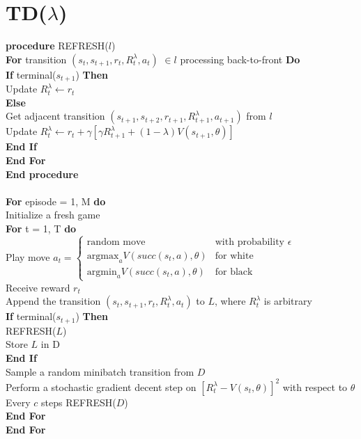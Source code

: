 \documentclass{article}
\begin{document}
\pagebreak

\section{TD($\lambda$)}
\textbf{procedure} REFRESH($l$) \\
\indent \textbf{For} transition $(s_t, s_{t+1}, r_t, R_t^\lambda, a_t)$ $\in l$ processing back-to-front \textbf{Do} \\
\indent \indent \textbf{If} terminal($s_{t+1}$) \textbf{Then} \\
\indent \indent \indent Update $R_t^\lambda \leftarrow r_t$ \\
\indent \indent \textbf{Else} \\
\indent \indent \indent Get adjacent transition $(s_{t+1}, s_{t+2}, r_{t+1}, R_{t+1}^\lambda, a_{t+1})$ from $l$ \\
\indent \indent \indent Update $R_t^\lambda \leftarrow r_t + \gamma [\gamma R_{t+1}^\lambda + (1 - \lambda) V(s_{t+1}, \theta)]$ \\
\indent \indent \textbf{End If} \\
\indent \textbf{End For} \\
\textbf{End procedure} \\
\\
\textbf{For} episode = 1, M \textbf{do} \\
\indent Initialize a fresh game \\
\indent \textbf {For} t = 1, T \textbf{do} \\
\indent \indent Play move
$
a_t= 
\begin{cases}
\text{random move} 							& \text{with probability } \epsilon \\
\text{argmax}_a V(succ(s_t, a), \theta)     & \text{for white} \\
\text{argmin}_a V(succ(s_t, a), \theta)     & \text{for black}
\end{cases}
$ \\
\indent \indent Receive reward $r_t$  \\
\indent \indent Append the transition $(s_t, s_{t+1}, r_t,  R_t^\lambda, a_t)$ to $L$, where $R_t^\lambda$ is arbitrary\\
\indent \indent \textbf{If} terminal($s_{t+1}$) \textbf{Then} \\
\indent \indent \indent REFRESH($L$) \\
\indent \indent \indent Store $L$ in D \\
\indent \indent \textbf{End If} \\
\indent \indent Sample a random minibatch transition from $D$  \\
\indent \indent Perform a stochastic gradient decent step on $[R_t^\lambda - V(s_t, \theta)]^2$ with respect to $\theta$  \\
\indent \indent Every $c$ steps REFRESH($D$)   \\
\indent  \textbf{End For}  \\
\textbf{End For} \\
\end{document}
